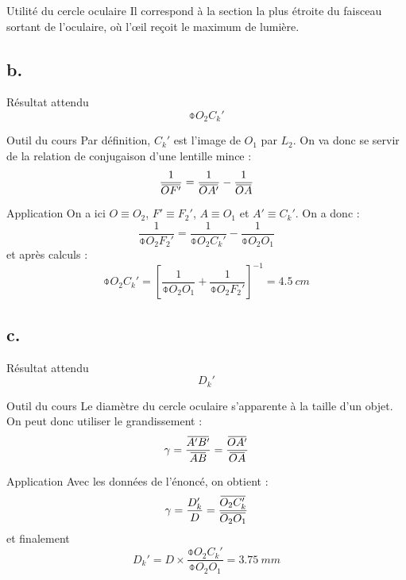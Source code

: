 \documentclass[10pt,a5paper,notitlepage]{book}
\begin{document}
\begin{inte}{Utilité du cercle oculaire}
    Il correspond à la section la plus étroite du faisceau sortant de
    l'oculaire, où l'œil reçoit le maximum de lumière.  
\end{inte}

\setcounter{subsection}{2}
\subsection{b.}
\begin{NCprop}{Résultat attendu}
    $$\obar{O_2C_k'}$$
\end{NCprop}

\begin{NCdemo}{Outil du cours}
    Par définition, $C_k'$ est l'image de $O_1$ par $L_2$. On va donc se servir
    de la relation de conjugaison d'une lentille mince :
    \[ \frac{1}{\OF} = \frac{1}{\OAp} - \frac{1}{\OA} \]
\end{NCdemo}

\begin{NCexem}{Application}
    On a ici $O \equiv O_2$, $F' \equiv F_2'$, $A \equiv O_1$ et $A' \equiv
    C_k'$. On a donc :
    \[ \frac{1}{\obar{O_2F_2'}} = \frac{1}{\obar{O_2C_k'}} -
    \frac{1}{\obar{O_2O_1}} \]
    et après calculs :
    \[ \boxed{\obar{O_2C_k'} = \left[ \frac{1}{\obar{O_2O_1}} +
    \frac{1}{\obar{O_2F_2'}}\right]^{-1} = \SI{+4.5}{cm}} \]
\end{NCexem}

\setcounter{subsection}{2}
\subsection{c.}
\begin{NCprop}{Résultat attendu}
    $$D_k'$$
\end{NCprop}

\begin{NCdemo}{Outil du cours}
    Le diamètre du cercle oculaire s'apparente à la taille d'un objet. On peut
    donc utiliser le grandissement :
    \[ \g = \frac{\ABp}{\ABb} = \frac{\OAp}{\OA} \]
\end{NCdemo}

\begin{NCexem}{Application}
    Avec les données de l'énoncé, on obtient :
    \[ \g = \frac{D_k'}{D} = \frac{\obar{O_2C_k'}}{\obar{O_2O_1}}\]
    et finalement
    \[ \boxed{D_k' = D\times \frac{\obar{O_2C_k'}}{\obar{O_2O_1}} =
    \SI{3.75}{mm}} \]
\end{NCexem}
\end{document}
